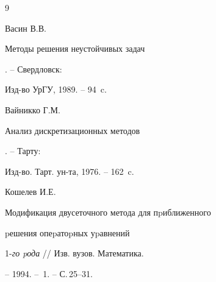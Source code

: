\begin{thebibliography}{9}


Васин В.В. {\em


Методы решения неустойчивых задач}. -- Свердловск:


Изд-во УрГУ, 1989. -- 94~c.




Вайникко Г.М. {\em


Анализ дискретизационных методов}. -- Тарту:


Изд-во. Тарт. ун-та, 1976. -- 162~c.




Кошелев И.Е. {\em


Модификация двусеточного метода для пpиближенного


pешения опеpатоpных уpавнений} 1-{\em го pода} // Изв. вузов. Математика.


-- 1994. -- \No\,1. -- С.\,25--31.





\end{thebibliography}





\vskip 2cm

















